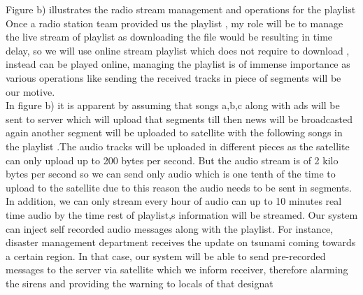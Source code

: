 Figure b) illustrates the radio stream management and operations for the playlist
Once a radio station team provided us the playlist , my role will be to manage the  live stream of playlist as downloading the file would be resulting in time delay, so we will use online stream playlist which does not require to download , instead can be played online, managing the  playlist is of immense importance as various operations like sending the received tracks in piece of segments  will be our motive.\\
 In figure b) it is apparent  by assuming that songs a,b,c along with ads will be sent to server  which will upload that segments till then news will be broadcasted  again another segment will be uploaded to satellite with the following songs in the playlist .The audio tracks will be uploaded in different pieces as the satellite can only upload up to 200 bytes per second. But the audio stream is of 2 kilo bytes per second  so we can send only audio which is one tenth of the time  to upload to the satellite due to this reason the audio needs to be sent in segments.\\
 In addition, we can only stream every hour of audio can up to 10 minutes real time audio by the time rest of  playlist,s information will be streamed.  Our system can inject self recorded audio messages along with the playlist. For instance, disaster management department receives the update on tsunami coming towards a certain region. In that case, our system will be able to send pre-recorded messages to the server via satellite which we inform receiver, therefore alarming the sirens and providing the warning to locals of that designat


